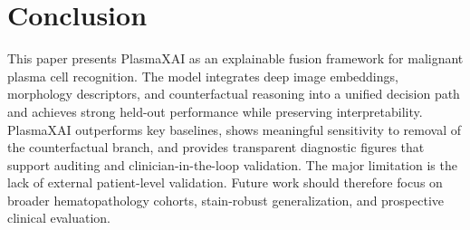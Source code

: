 \documentclass[runningheads]{llncs}
\begin{document}
\section{Conclusion}
This paper presents PlasmaXAI as an explainable fusion framework for malignant plasma cell recognition. The model integrates deep image embeddings, morphology descriptors, and counterfactual reasoning into a unified decision path and achieves strong held-out performance while preserving interpretability. PlasmaXAI outperforms key baselines, shows meaningful sensitivity to removal of the counterfactual branch, and provides transparent diagnostic figures that support auditing and clinician-in-the-loop validation. The major limitation is the lack of external patient-level validation. Future work should therefore focus on broader hematopathology cohorts, stain-robust generalization, and prospective clinical evaluation.
\end{document}
